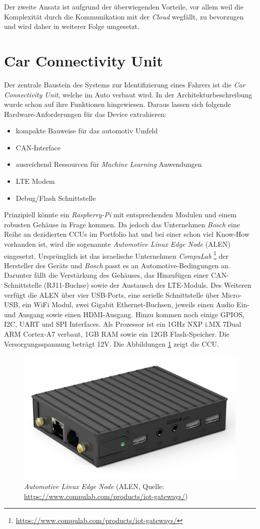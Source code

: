 Der zweite Ansatz ist aufgrund der überwiegenden Vorteile, vor allem weil die Komplexität durch die Kommunikation mit der \textit{Cloud} wegfällt, zu bevorzugen und wird daher in weiterer Folge umgesetzt.

\section{Car Connectivity Unit}
\label{sec:ccu}

Der zentrale Baustein des Systems zur Identifizierung eines Fahrers ist die \textit{Car Connectivity Unit}, welche im Auto verbaut wird. In der Architekturbeschreibung wurde schon auf ihre Funktionen hingewiesen. Daraus lassen sich folgende Hardware-Anforderungen für das Device extrahieren:

\begin{itemize}
    \item kompakte Bauweise für das automotiv Umfeld
    \item CAN-Interface
    \item ausreichend Ressourcen für \textit{Machine Learning} Anwendungen
    \item LTE Modem
    \item Debug/Flash Schnittstelle
\end{itemize}

Prinzipiell könnte ein \textit{Raspberry-Pi} mit entsprechenden Modulen und einem robusten Gehäuse in Frage kommen. Da jedoch das Unternehmen \textit{Bosch} eine Reihe an dezidierten CCUs im Portfolio hat und bei einer schon viel Know-How vorhanden ist, wird die sogenannte \textit{Automotive Linux Edge Node} (ALEN) eingesetzt. Ursprünglich ist das israelische Unternehmen \textit{CompuLab} \footnote{\url{https://www.compulab.com/products/iot-gateways/}} der Hersteller des Geräts und \textit{Bosch} passt es an Automotive-Bedingungen an. Darunter fällt die Verstärkung des Gehäuses, das Hinzufügen einer CAN-Schnittstelle (RJ11-Buchse) sowie der Austausch des LTE-Moduls. Des Weiteren verfügt die ALEN über vier USB-Ports, eine serielle Schnittstelle über Micro-USB, ein WiFi Modul, zwei Gigabit Ethernet-Buchsen, jeweils einen Audio Ein- und Ausgang sowie einen HDMI-Ausgang. Hinzu kommen noch einige GPIOS, I2C, UART und SPI Interfaces. Als Prozessor ist ein 1GHz NXP i.MX 7Dual ARM Cortex-A7 verbaut, 1GB RAM sowie ein 12GB Flash-Speicher. Die Versorgungsspannung beträgt 12V. Die Abbildungen \ref{fig:alen} zeigt die CCU.

\begin{figure}[htbp]
	\centering
    \includegraphics[width=.5\textwidth]{images/alen.jpg}
	\caption{\textit{Automotive Linux Edge Node} (ALEN, Quelle: \url{https://www.compulab.com/products/iot-gateways/})}
	\label{fig:alen}
\end{figure}

